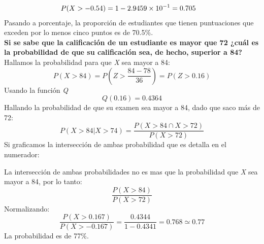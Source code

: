 \documentclass[
	12pt, %
	fleqn, %
	a4paper, %
	oneside, %
]{LegrandOrangeBook}
\begin{document}
\begin{example}
\begin{align*}
&P(X>-0.54)=1-2.9459\times 10^{-1}=0.705
\end{align*}
Pasando a porcentaje, la proporción de estudiantes que tienen puntuaciones que exceden por lo menos cinco puntos es de 70.5\%.\\
\textbf{Si se sabe que la calificación de un estudiante es mayor que 72 ¿cuál es la probabilidad de que su calificación sea, de hecho, superior a 84?}\\
Hallamos la probabilidad para que \textit{X} sea mayor a 84:
\begin{displaymath}
P\left(X>84\right)=P\left(Z>\frac{84-78}{36}\right)=P\left(Z>0.16\right)
\end{displaymath}
Usando la función \textit{Q}
\begin{displaymath}
Q(0.16)=0.4364
\end{displaymath}
Hallando la probabilidad de que su examen sea mayor a 84, dado que saco más de 72:
\begin{displaymath}
P\left(X>84|X>74\right)=\frac{P\left(X>84\cap X>72\right)}{P\left(X>72\right)}
\end{displaymath}
Si graficamos la intersección de ambas probabilidad que es detalla en el numerador:
\begin{center}
\end{center}
La intersección de ambas probabilidades no es mas que la probabilidad que \textit{X} sea mayor a 84, por lo tanto:
\begin{displaymath}
\frac{P\left(X>84\right)}{P\left(X>72\right)}
\end{displaymath}
Normalizando:
\begin{displaymath}
\frac{P\left(X>0.167\right)}{P\left(X>-0.167\right)}=\frac{0.4344}{1-0.4341}=0.768\simeq 0.77
\end{displaymath}
La probabilidad es de 77\%.
\end{example}
\end{document}
